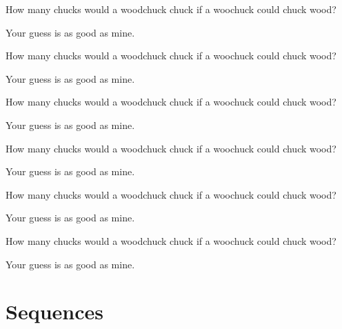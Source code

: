 \documentclass[12pt]{article}
\newenvironment{question}[2][Q]{\begin{trivlist}
\item[\hskip \labelsep {\bfseries #1}\hskip \labelsep {\bfseries #2.}]}{\end{trivlist}}
\newenvironment{answer}[2][A]{\begin{trivlist}
\item[\hskip \labelsep {\bfseries #1}\hskip \labelsep {\bfseries #2.}]}{\end{trivlist}}
\begin{document}
\begin{question}{5}
  How many chucks would a woodchuck chuck if a woochuck could chuck wood?
\end{question}

\begin{answer}{5}
Your guess is as good as mine.
\end{answer}


\begin{question}{6}
  How many chucks would a woodchuck chuck if a woochuck could chuck wood?
\end{question}

\begin{answer}{6}
Your guess is as good as mine.
\end{answer}

\begin{question}{7}
  How many chucks would a woodchuck chuck if a woochuck could chuck wood?
\end{question}

\begin{answer}{7}
Your guess is as good as mine.
\end{answer}

\begin{question}{8}
  How many chucks would a woodchuck chuck if a woochuck could chuck wood?
\end{question}

\begin{answer}{8}
Your guess is as good as mine.
\end{answer}

\begin{question}{9}
  How many chucks would a woodchuck chuck if a woochuck could chuck wood?
\end{question}

\begin{answer}{9}
Your guess is as good as mine.
\end{answer}

\begin{question}{10}
  How many chucks would a woodchuck chuck if a woochuck could chuck wood?
\end{question}

\begin{answer}{10}
Your guess is as good as mine.
\end{answer}

\section{Sequences}
\end{document}
